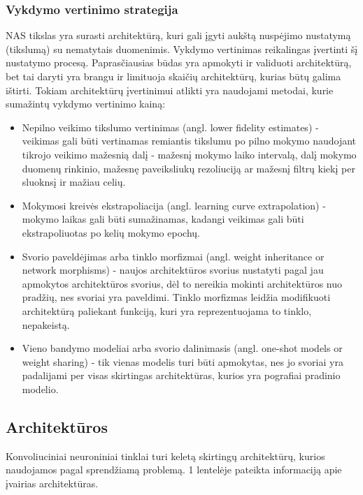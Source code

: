 \documentclass{VUMIFPSbakalaurinis}
\begin{document}
\subsubsection{Vykdymo vertinimo strategija}

NAS tikslas yra surasti architektūrą, kuri gali įgyti aukštą nuspėjimo nustatymą (tikslumą) su nematytais duomenimis. Vykdymo vertinimas reikalingas įvertinti šį nustatymo procesą. Paprasčiausias būdas yra apmokyti ir validuoti architektūrą, bet tai daryti yra brangu ir limituoja skaičių architektūrų, kurias būtų galima ištirti. 
Tokiam architektūrų įvertinimui atlikti yra naudojami metodai, kurie sumažintų vykdymo vertinimo kainą:
\begin{itemize}
    \item Nepilno veikimo tikslumo vertinimas (angl. lower fidelity estimates) - veikimas gali būti vertinamas remiantis tikslumu po pilno mokymo naudojant tikrojo veikimo mažesnią dalį - mažesnį mokymo laiko intervalą, dalį mokymo duomenų rinkinio, mažesnę paveiksliukų rezoliuciją ar mažesnį filtrų kiekį per sluoknsį ir mažiau celių. 
    \item Mokymosi kreivės ekstrapoliacija (angl. learning curve extrapolation) - mokymo laikas gali būti sumažinamas, kadangi veikimas gali būti ekstrapoliuotas po kelių mokymo epochų.
    \item Svorio paveldėjimas arba tinklo morfizmai (angl. weight inheritance or network morphisms) - naujos architektūros svorius nustatyti pagal jau apmokytos architektūros svorius, dėl to nereikia mokinti architektūros nuo pradžių, nes svoriai yra paveldimi. Tinklo morfizmas leidžia modifikuoti architektūrą paliekant funkciją, kuri yra reprezentuojama to tinklo, nepakeistą.
    \item Vieno bandymo modeliai arba svorio dalinimasis (angl. one-shot models or weight sharing) - tik vienas modelis turi būti apmokytas, nes jo svoriai yra padalijami per visas skirtingas architektūras, kurios yra pografiai pradinio modelio.
\end{itemize}

\subsection{Architektūros}
Konvoliuciniai neuroniniai tinklai turi keletą skirtingų architektūrų, kurios naudojamos pagal sprendžiamą problemą. 1 lentelėje pateikta informaciją 
apie įvairias architektūras.
\end{document}
